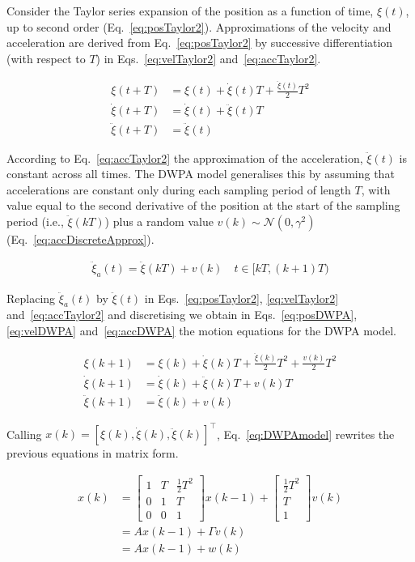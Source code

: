 \documentclass[fleqn,12pt]{article}
\begin{document}
Consider the Taylor series expansion of the position as a function of time,
$\xi(t)$, up to second order (Eq.~\ref{eq:posTaylor2}). Approximations of the
velocity and acceleration are derived from Eq.~\ref{eq:posTaylor2} by
successive differentiation (with respect to $T$) in Eqs.~\ref{eq:velTaylor2}
and~\ref{eq:accTaylor2}.

\begin{align}
    \xi(t+T)&=\xi(t)+\dot{\xi}(t)T+\frac{\ddot{\xi}(t)}{2}T^2\label{eq:posTaylor2}\\
    \dot{\xi}(t+T)&=\dot{\xi}(t)+\ddot{\xi}(t)T\label{eq:velTaylor2}\\
    \ddot{\xi}(t+T)&=\ddot{\xi}(t)\label{eq:accTaylor2}
\end{align}

According to Eq.~\ref{eq:accTaylor2} the approximation of the acceleration,
$\ddot{\xi}(t)$ is constant across all times. The DWPA model generalises this
by assuming that accelerations are constant only during each sampling period
of length $T$, with value equal to the second derivative of the position at the
start of the sampling period (i.e., $\ddot{\xi}(kT)$) plus a random value
$v(k)\sim\mathcal{N}(0,\gamma^2)$ (Eq.~\ref{eq:accDiscreteApprox}).

\begin{align}
    \ddot{\xi}_a(t)=\ddot{\xi}(kT)+v(k)\quad t\in[kT,(k+1)T)\label{eq:accDiscreteApprox}
\end{align}

Replacing $\ddot{\xi}_a(t)$ by $\ddot{\xi}(t)$ in Eqs.~\ref{eq:posTaylor2},
\ref{eq:velTaylor2} and~\ref{eq:accTaylor2} and discretising we obtain in
Eqs.~\ref{eq:posDWPA}, \ref{eq:velDWPA} and~\ref{eq:accDWPA} the motion
equations for the DWPA model.

\begin{align}
    \xi(k+1)&=\xi(k)+\dot{\xi}(k)T+\frac{\ddot{\xi}(k)}{2}T^2+\frac{v(k)}{2}T^2\label{eq:posDWPA}\\
    \dot{\xi}(k+1)&=\dot{\xi}(k)+\ddot{\xi}(k)T+v(k)T\label{eq:velDWPA}\\
    \ddot{\xi}(k+1)&=\ddot{\xi}(k)+v(k)\label{eq:accDWPA}
\end{align}

Calling $x(k)=[\xi(k), \dot{\xi}(k), \ddot{\xi}(k)]^\intercal$,
Eq.~\ref{eq:DWPAmodel} rewrites the previous
equations in matrix form.

\begin{align}
    x(k)&=\begin{bmatrix}
        1 & T & \frac{1}{2}T^2\\
        0 & 1 & T\\
        0 & 0 & 1
           \end{bmatrix}
           x(k-1)+
           \begin{bmatrix}
               \frac{1}{2}T^2\\
               T\\
               1
           \end{bmatrix}
           v(k)\nonumber\\
           &=Ax(k-1)+\Gamma v(k)\nonumber\\
           &=Ax(k-1)+w(k)\label{eq:DWPAmodel}
\end{align}
\end{document}
